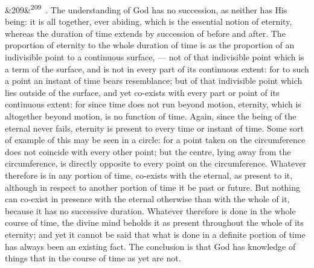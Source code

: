 \documentclass[12pt]{article}
\newcommand{\para}[1][]{\par\noindent\ifx&#1&\else\textsuperscript{\footnotesize #1}~\fi}
\begin{document}
\para[209] 6. The understanding of God has no succession, as neither has His being: it is all together, ever abiding, which is the essential notion of eternity, whereas the duration of time extends by succession of before and after. The proportion of eternity to the whole duration of time is as the proportion of an indivisible point to a continuous surface, --- not of that indivisible point which is a term of the surface, and is not in every part of its continuous extent: for to such a point an instant of time bears resemblance; but of that indivisible point which lies outside of the surface, and yet co-exists with every part or point of its continuous extent: for since time does not run beyond motion, eternity, which is altogether beyond motion, is no function of time. Again, since the being of the eternal never fails, eternity is present to every time or instant of time. Some sort of example of this may be seen in a circle: for a point taken on the circumference does not coincide with every other point; but the centre, lying away from the circumference, is directly opposite to every point on the circumference. Whatever therefore is in any portion of time, co-exists with the eternal, as present to it, although in respect to another portion of time it be past or future. But nothing can co-exist in presence with the eternal otherwise than with the whole of it, because it has no successive duration. Whatever therefore is done in the whole course of time, the divine mind beholds it as present throughout the whole of its eternity; and yet it cannot be said that what is done in a definite portion of time has always been an existing fact. The conclusion is that God has knowledge of things that in the course of time as yet are not.
\end{document}
